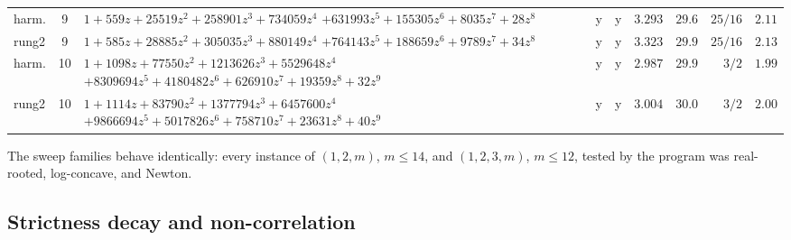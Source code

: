 \begin{table}[htbp]
\begin{tabularx}{\textwidth}{@{} l c >{\raggedright\arraybackslash}X c c r r r r @{}}
harm. & 9 & $1+559z+25519z^2+258901z^3+734059z^4$\newline
$+631993z^5+155305z^6+8035z^7+28z^8$ & y & y & $3.293$ & $29.6$ & $25/16$ & $2.11$ \\
rung2 & 9 & $1+585z+28885z^2+305035z^3+880149z^4$\newline
$+764143z^5+188659z^6+9789z^7+34z^8$ & y & y & $3.323$ & $29.9$ & $25/16$ & $2.13$ \\
harm. & 10 & $1+1098z+77550z^2+1213626z^3+5529648z^4$\newline
$+8309694z^5+4180482z^6+626910z^7+19359z^8+32z^9$ & y & y & $2.987$
& $29.9$ & $3/2$ & $1.99$ \\
rung2 & 10 & $1+1114z+83790z^2+1377794z^3+6457600z^4$\newline
$+9866694z^5+5017826z^6+758710z^7+23631z^8+40z^9$ & y & y & $3.004$
& $30.0$ & $3/2$ & $2.00$ \\
\bottomrule
\end{tabularx}
\end{table}

The sweep families behave identically: every instance of $(1,2,m)$,
$m\le14$, and $(1,2,3,m)$, $m\le12$, tested by the program was
real-rooted, log-concave, and Newton.

\subsection{Strictness decay and non-correlation}

